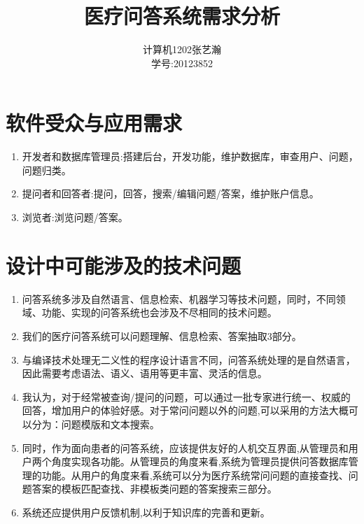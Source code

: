 \documentclass[11pt]{article}
\begin{document}
\title{医疗问答系统需求分析}
\author{计算机1202\quad 张艺瀚\\学号:20123852}
\maketitle

\thispagestyle{fancy}
\normalsize

\section{软件受众与应用需求}
\begin{enumerate}
\item {\color{red}开发者和数据库管理员}:搭建后台，开发功能，维护数据库，审查用户、问题，问题归类。
\item {\color{red}提问者和回答者}:提问，回答，搜索/编辑问题/答案，维护账户信息。
\item {\color{red}浏览者}:浏览问题/答案。
\end{enumerate}

\section{设计中可能涉及的技术问题}
\begin{enumerate}
\item 问答系统多涉及自然语言、信息检索、机器学习等技术问题，同时，不同领域、功能、实现的问答系统也会涉及不尽相同的技术问题。
\item 我们的医疗问答系统可以问题理解、信息检索、答案抽取3部分。
\item 与编译技术处理无二义性的程序设计语言不同，问答系统处理的是自然语言，因此需要考虑语法、语义、语用等更丰富、灵活的信息。
\item 我认为，对于经常被查询/提问的问题，可以通过一批专家进行统一、权威的回答，增加用户的体验好感。对于常问问题以外的问题,可以采用的方法大概可以分为：问题模版和文本搜索。
\item 同时，作为面向患者的问答系统，应该提供友好的人机交互界面,从管理员和用户两个角度实现各功能。从管理员的角度来看,系统为管理员提供问答数据库管理的功能。从用户的角度来看,系统可以分为医疗系统常问问题的直接查找、问题答案的模板匹配查找、非模板类问题的答案搜索三部分。
\item 系统还应提供用户反馈机制,以利于知识库的完善和更新。
\end{enumerate}
\end{document}
